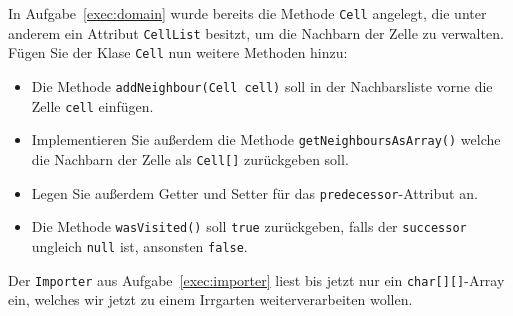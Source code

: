 \documentclass{exam}
\begin{document}
\begin{questions}

In Aufgabe~\ref{exec:domain} wurde bereits die Methode \verb|Cell| angelegt, die unter anderem ein Attribut \verb|CellList| besitzt, um die Nachbarn der Zelle zu verwalten. Fügen Sie der Klase \verb|Cell| nun weitere Methoden hinzu:

\begin{itemize}
\item Die Methode \verb|addNeighbour(Cell cell)| soll in der Nachbarsliste vorne die Zelle \verb|cell| einfügen.
\item Implementieren Sie außerdem die Methode \verb|getNeighboursAsArray()| welche die Nachbarn der Zelle als \verb|Cell[]| zurückgeben soll.
\item Legen Sie außerdem Getter und Setter für das \verb|predecessor|-Attribut an.
\item Die Methode \verb|wasVisited()| soll \verb|true| zurückgeben, falls der \verb|successor| ungleich \verb|null| ist, ansonsten \verb|false|.
\end{itemize}

\label{exec:mazebuilder}

Der \verb|Importer| aus Aufgabe~\ref{exec:importer} liest bis jetzt nur ein \verb|char[][]|-Array ein, welches wir jetzt zu einem Irrgarten weiterverarbeiten wollen.

\end{questions}
\end{document}
